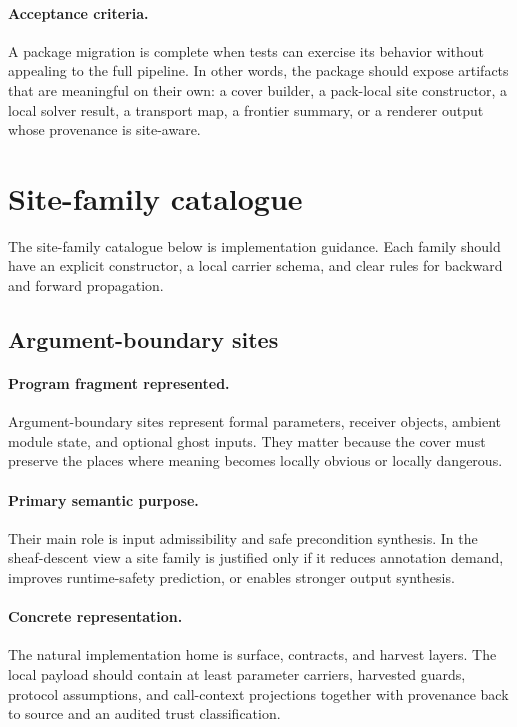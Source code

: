 \documentclass[11pt]{report}
\theoremstyle{definition}
\theoremstyle{plain}
\begin{document}
\paragraph{Acceptance criteria.}
A package migration is complete when tests can exercise its behavior without
appealing to the full pipeline. In other words, the package should expose
artifacts that are meaningful on their own: a cover builder, a pack-local
site constructor, a local solver result, a transport map, a frontier summary,
or a renderer output whose provenance is site-aware.


\section{Site-family catalogue}

The site-family catalogue below is implementation guidance. Each family should have an explicit constructor, a local carrier schema, and clear rules for backward and forward propagation.
\subsection{Argument-boundary sites}

\paragraph{Program fragment represented.}
Argument-boundary sites represent formal parameters, receiver objects, ambient module state, and optional ghost inputs. They matter because the cover must preserve the
places where meaning becomes locally obvious or locally dangerous.

\paragraph{Primary semantic purpose.}
Their main role is input admissibility and safe precondition synthesis. In the sheaf-descent view a site family is
justified only if it reduces annotation demand, improves runtime-safety
prediction, or enables stronger output synthesis.

\paragraph{Concrete representation.}
The natural implementation home is surface, contracts, and harvest layers. The local payload should contain
at least parameter carriers, harvested guards, protocol assumptions, and call-context projections together with provenance back to source and an audited
trust classification.
\end{document}
